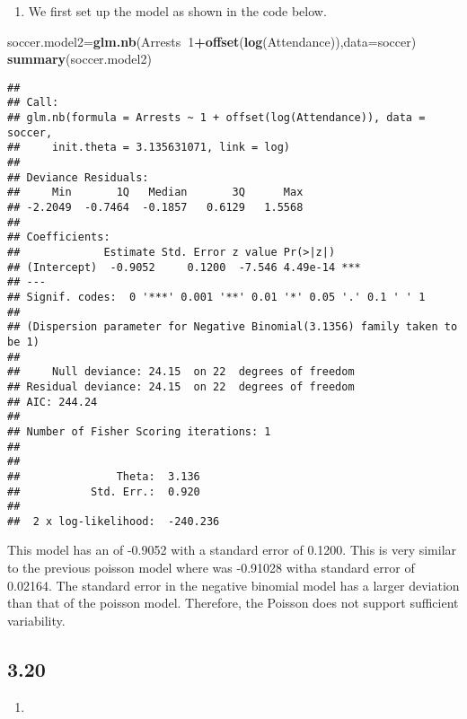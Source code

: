 \documentclass[
]{article}
\newenvironment{Shaded}{\begin{snugshade}}{\end{snugshade}}
\newcommand{\DataTypeTok}[1]{\textcolor[rgb]{0.13,0.29,0.53}{#1}}
\newcommand{\DecValTok}[1]{\textcolor[rgb]{0.00,0.00,0.81}{#1}}
\newcommand{\KeywordTok}[1]{\textcolor[rgb]{0.13,0.29,0.53}{\textbf{#1}}}
\newcommand{\NormalTok}[1]{#1}
\newcommand{\OperatorTok}[1]{\textcolor[rgb]{0.81,0.36,0.00}{\textbf{#1}}}
\providecommand{\tightlist}{%
  \setlength{\itemsep}{0pt}\setlength{\parskip}{0pt}}
\begin{document}
\begin{enumerate}
\def\labelenumi{\alph{enumi})}
\setcounter{enumi}{3}
\tightlist
\item
  We first set up the model as shown in the code below.
\end{enumerate}

\begin{Shaded}
\begin{Highlighting}[]
\NormalTok{soccer.model2=}\KeywordTok{glm.nb}\NormalTok{(Arrests}\OperatorTok{~}\DecValTok{1}\OperatorTok{+}\KeywordTok{offset}\NormalTok{(}\KeywordTok{log}\NormalTok{(Attendance)),}\DataTypeTok{data=}\NormalTok{soccer)}
\KeywordTok{summary}\NormalTok{(soccer.model2)}
\end{Highlighting}
\end{Shaded}

\begin{verbatim}
## 
## Call:
## glm.nb(formula = Arrests ~ 1 + offset(log(Attendance)), data = soccer, 
##     init.theta = 3.135631071, link = log)
## 
## Deviance Residuals: 
##     Min       1Q   Median       3Q      Max  
## -2.2049  -0.7464  -0.1857   0.6129   1.5568  
## 
## Coefficients:
##             Estimate Std. Error z value Pr(>|z|)    
## (Intercept)  -0.9052     0.1200  -7.546 4.49e-14 ***
## ---
## Signif. codes:  0 '***' 0.001 '**' 0.01 '*' 0.05 '.' 0.1 ' ' 1
## 
## (Dispersion parameter for Negative Binomial(3.1356) family taken to be 1)
## 
##     Null deviance: 24.15  on 22  degrees of freedom
## Residual deviance: 24.15  on 22  degrees of freedom
## AIC: 244.24
## 
## Number of Fisher Scoring iterations: 1
## 
## 
##               Theta:  3.136 
##           Std. Err.:  0.920 
## 
##  2 x log-likelihood:  -240.236
\end{verbatim}

This model has an \alpha of -0.9052 with a standard error of 0.1200.
This is very similar to the previous poisson model where \alpha was
-0.91028 witha standard error of 0.02164. The standard error in the
negative binomial model has a larger deviation than that of the poisson
model. Therefore, the Poisson does not support sufficient variability.

\hypertarget{section-6}{%
\subsection{3.20}\label{section-6}}

\begin{enumerate}
\def\labelenumi{\alph{enumi})}
\item
\end{enumerate}
\end{document}
